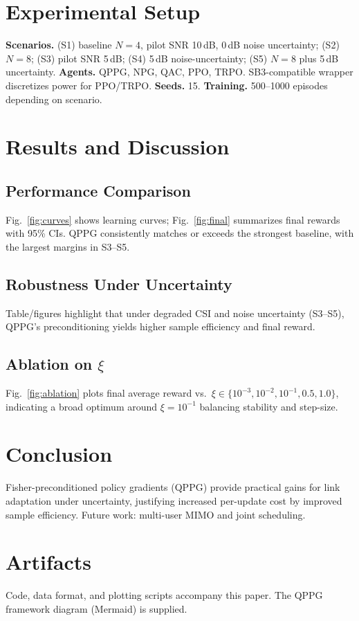 \documentclass[10pt,conference]{IEEEtran}
\begin{document}
\section{Experimental Setup}
\textbf{Scenarios.} (S1) baseline $N{=}4$, pilot SNR 10\,dB, 0\,dB noise uncertainty;
(S2) $N{=}8$; (S3) pilot SNR 5\,dB; (S4) 5\,dB noise-uncertainty; (S5) $N{=}8$ plus 5\,dB uncertainty.
\textbf{Agents.} QPPG, NPG, QAC, PPO, TRPO. SB3-compatible wrapper discretizes power for PPO/TRPO.
\textbf{Seeds.} 15. \textbf{Training.} 500--1000 episodes depending on scenario.

\section{Results and Discussion}
\subsection{Performance Comparison}
Fig.~\ref{fig:curves} shows learning curves; Fig.~\ref{fig:final} summarizes final rewards with 95\% CIs. QPPG consistently matches or exceeds the strongest baseline, with the largest margins in S3--S5.

\subsection{Robustness Under Uncertainty}
Table/figures highlight that under degraded CSI and noise uncertainty (S3--S5), QPPG's preconditioning yields higher sample efficiency and final reward.

\subsection{Ablation on $\xi$}
Fig.~\ref{fig:ablation} plots final average reward vs.\ $\xi \in \{10^{-3},10^{-2},10^{-1},0.5,1.0\}$, indicating a broad optimum around $\xi=10^{-1}$ balancing stability and step-size.

\section{Conclusion}
Fisher-preconditioned policy gradients (QPPG) provide practical gains for link adaptation under uncertainty, justifying increased per-update cost by improved sample efficiency. Future work: multi-user MIMO and joint scheduling.

\section*{Artifacts}
Code, data format, and plotting scripts accompany this paper. The QPPG framework diagram (Mermaid) is supplied.
\end{document}
